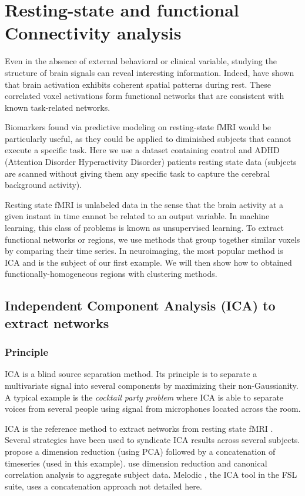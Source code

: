 \documentclass{frontiersSCNS} %
\begin{document}
\section{Resting-state and functional Connectivity analysis}

Even in the absence of external behavioral or clinical variable, studying
the structure of brain signals can reveal interesting information.
Indeed, \cite{biswal1995} have shown that brain activation exhibits
coherent spatial patterns during rest. These correlated voxel activations
form functional networks that are consistent with known task-related networks.

Biomarkers found via predictive modeling on resting-state fMRI would be
particularly useful, as they could be applied to diminished subjects that
cannot execute a specific task. Here we use a dataset containing control
and ADHD (Attention Disorder Hyperactivity Disorder) patients resting
state data (subjects are scanned without giving them any specific task to
capture the cerebral background activity).

Resting state fMRI is unlabeled data in the sense that the brain activity
at a given instant in time cannot be related to an output variable.
In machine learning, this class of problems is known as unsupervised
learning. 
To extract functional networks or regions, we use methods that group together 
similar voxels by comparing their time
series. In neuroimaging, the most popular method is ICA and
is the subject of our first example. We will then show how to obtained 
functionally-homogeneous regions with
clustering methods.

\subsection{Independent Component Analysis (ICA) to extract networks}

\subsubsection{Principle}

ICA is a blind source separation method. Its principle is to separate a
multivariate signal into several components by maximizing their non-Gaussianity.
A typical example is the \emph{cocktail party problem} where ICA is able to separate
voices from several people using signal from microphones located across the room.

ICA is the reference method to extract networks from resting state
fMRI \citep{kiviniemi2003}. Several strategies have been used to syndicate ICA
results across several subjects. \cite{calhoun2001a} propose a dimension
reduction (using PCA) followed by a concatenation of timeseries (used in this
example). \cite{varoquaux2010} use dimension reduction and canonical correlation analysis
to aggregate subject data. Melodic \citep{beckmann2004}, the ICA tool in
the FSL suite, uses a concatenation approach not detailed here.
\end{document}
